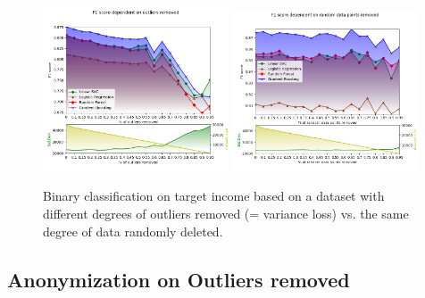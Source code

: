 \documentclass{llncs}
\begin{document}
\begin{figure}[H]
	\centering
	\includegraphics[width=0.49\textwidth]{figures/outliers/outliers_removed_all_algos_std_blur_bright}
	\includegraphics[width=0.49\textwidth]{figures/outliers/randomly_removed_points_all_algos_std_blur_bright}
	\caption{Binary classification on target income based on a dataset with different degrees of outliers removed (= variance loss) vs. the same degree of data randomly deleted.}
	\label{fig:results_outliers_removed}
\end{figure}





\subsection{Anonymization on Outliers removed}
\label{ssect:anon_outliers_removed}
\end{document}
